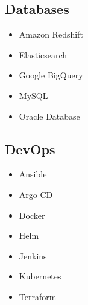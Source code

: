 \documentclass[letterpaper]{resume}
\begin{document}
\begin{minipage}[t]{0.27\columnwidth}
\sectionspace

\subsection{Databases}
\vspace{2pt}
\begin{itemize}
\item Amazon Redshift
\item Elasticsearch
\item Google BigQuery
\item MySQL
\item Oracle Database
\end{itemize}

\sectionspace

\subsection{DevOps}
\vspace{2pt}
\begin{itemize}
\item Ansible
\item Argo CD
\item Docker
\item Helm
\item Jenkins
\item Kubernetes
\item Terraform
\end{itemize}

\sectionspace

\end{minipage}
\hfill
\end{document}
